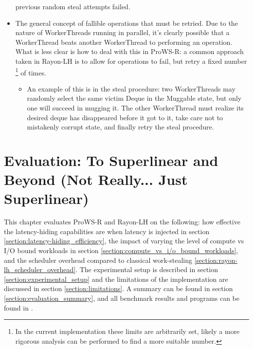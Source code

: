 \documentclass[bsc,frontabs,singlespacing,parskip,deptreport,normalheadings]{infthesis}
\begin{document}
\begin{itemize}
        previous random steal attempts failed.
    \item The general concept of fallible operations that must be retried. Due
        to the nature of WorkerThreads running in parallel, it's clearly
        possible that a WorkerThread beats another WorkerThread to performing an
        operation. What is less clear is how to deal with this in ProWS-R: a
        common approach taken in Rayon-LH is to allow for operations to fail,
        but retry a fixed number \footnote{In the current implementation these
        limits are arbitrarily set, likely a more rigorous analysis can be
        performed to find a more suitable number.} of times.
    \begin{itemize}
        \item An example of this is in the steal procedure: two WorkerThreads
            may randomly select the same victim Deque in the Muggable state, but
            only one will succeed in mugging it. The other WorkerThread must
            realize its desired deque has disappeared before it got to it, take
            care not to mistakenly corrupt state, and finally retry the steal
            procedure.
    \end{itemize}
\end{itemize}


\chapter{Evaluation: To Superlinear and Beyond (Not Really... Just Superlinear)}
\label{chapter:evaluation:_to_superlinear_and_beyond_(not_really..._just_superlinear)}

This chapter evaluates ProWS-R and Rayon-LH on the following: how effective the
latency-hiding capabilities are when latency is injected in section
\ref{section:latency-hiding_efficiency}, the impact of varying the level of
compute vs I/O bound workloads in section
\ref{section:compute_vs_i/o_bound_workloads}, and the scheduler overhead
compared to classical work-stealing \ref{section:rayon-lh_scheduler_overhead}.
The experimental setup is described in section \ref{section:experimental_setup}
and the limitations of the implementation are discussed in section
\ref{section:limitations}. A summary can be found in section
\ref{section:evaluation_summary}, and all benchmark results and programs can be
found in \cite{noauthor_rayon-lh_nodate}.
\end{document}
